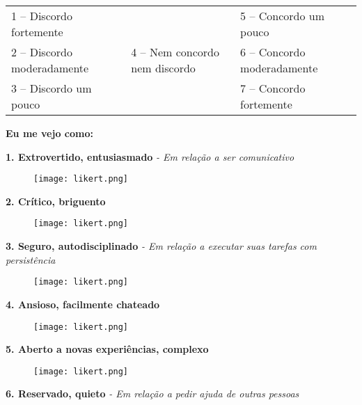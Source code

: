 \vspace{0.5cm}
\noindent
\begin{tabular}{lll}
\footnotesize 1 – Discordo fortemente 		& 																						& \footnotesize 5 – Concordo um pouco\\
\footnotesize 2 – Discordo moderadamente 	& \footnotesize 4 – Nem concordo nem discordo	& \footnotesize 6 – Concordo moderadamente\\
\footnotesize 3 – Discordo um pouco 			&																							& \footnotesize 7 – Concordo fortemente\\
\end{tabular}

\vspace{0.5cm}
\textbf{Eu me vejo como:}
\vspace{0.5cm}

\noindent
\textbf{1. Extrovertido, entusiasmado} \footnotesize \textsl{- Em relação a ser comunicativo}
\normalsize
 
\begin{figure}[!h]
\texttt{[image: likert.png]}
\end{figure}

\newpage%
\noindent
\textbf{2. Crítico, briguento}

\begin{figure}[!h]
\texttt{[image: likert.png]}
\end{figure}

\noindent  
\textbf{3. Seguro, autodisciplinado}   \footnotesize \textsl{- Em relação a executar suas tarefas com persistência}
\normalsize

\begin{figure}[!h]
\texttt{[image: likert.png]}
\end{figure}
 
\noindent
\textbf{4. Ansioso, facilmente chateado}

\begin{figure}[!h]
\texttt{[image: likert.png]}
\end{figure}

\noindent
\textbf{5. Aberto a novas experiências, complexo} 

\begin{figure}[!h]
\texttt{[image: likert.png]}
\end{figure}
 
\noindent
\textbf{6. Reservado, quieto}          \footnotesize \textsl{- Em relação a pedir ajuda de outras pessoas} \normalsize

